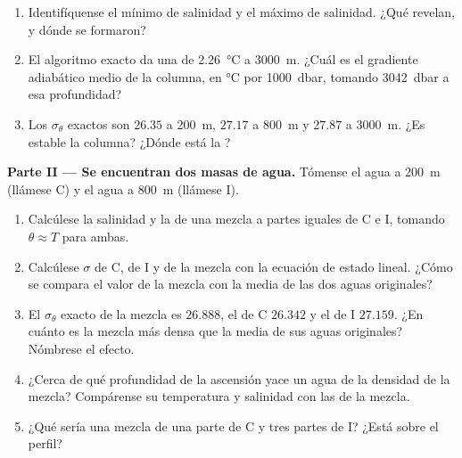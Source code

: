 \begin{problem}
\begin{enumerate}
        ecuación exacta da $\sigma_\theta = 24.71$: explíquese la diferencia.
  \item Identifíquense el mínimo de salinidad y el máximo de salinidad. ¿Qué  revelan, y dónde se formaron?
  \item El algoritmo exacto da una  de
        \qty{2.26}{\celsius} a \qty{3000}{m}. ¿Cuál es el gradiente adiabático medio de la columna, en \si{\celsius} por \qty{1000}{dbar}, tomando
        \qty{3042}{dbar} a esa profundidad?
  \item Los $\sigma_\theta$ exactos son $26.35$ a \qty{200}{m}, $27.17$ a
        \qty{800}{m} y $27.87$ a \qty{3000}{m}. ¿Es estable la columna? ¿Dónde está la ?
\end{enumerate}

\medskip
\noindent\textbf{Parte II --- Se encuentran dos masas de agua.} Tómense el agua a
\qty{200}{m} (llámese C) y el agua a \qty{800}{m} (llámese I).
\begin{enumerate}[resume]
  \item Calcúlese la salinidad y la  de una mezcla a partes
        iguales de C e I, tomando $\theta \approx T$ para ambas.
  \item Calcúlese $\sigma$ de C, de I y de la mezcla con la ecuación de estado
        lineal. ¿Cómo se compara el valor de la mezcla con la media de las dos aguas originales?
  \item El $\sigma_\theta$ exacto de la mezcla es $26.888$, el de C $26.342$
        y el de I $27.159$. ¿En cuánto es la mezcla más densa que la media de sus aguas originales? Nómbrese el efecto.
  \item ¿Cerca de qué profundidad de la ascensión yace un agua de la densidad de la mezcla? Compárense su temperatura y salinidad con las de la mezcla.
  \item ¿Qué sería una mezcla de una parte de C y tres partes de I? ¿Está sobre el perfil?
\end{enumerate}


\end{problem}
